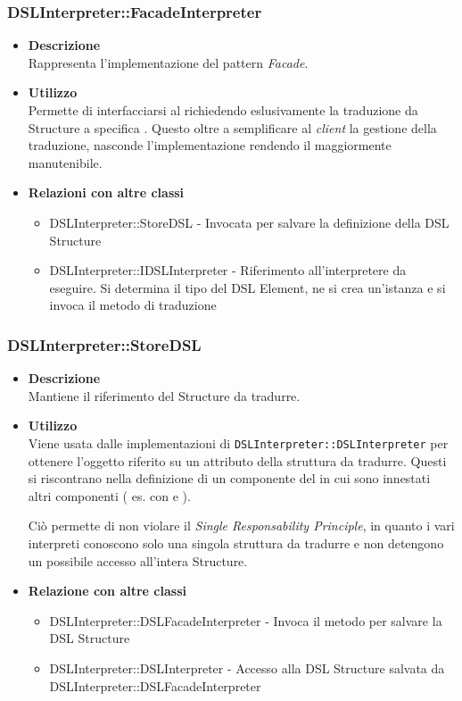 \subsubsection{DSLInterpreter::FacadeInterpreter}
\begin{itemize}
\item \textbf{Descrizione} \hfill \\
  Rappresenta l'implementazione del pattern \textit{Facade}.
\item \textbf{Utilizzo} \hfill \\
  Permette di interfacciarsi al  richiedendo eslusivamente la traduzione da  Structure a specifica . Questo oltre a semplificare al \textit{client} la gestione della traduzione, nasconde l'implementazione rendendo il  maggiormente manutenibile.
\item \textbf{Relazioni con altre classi} \hfill
  \begin{itemize}
  \item DSLInterpreter::StoreDSL - Invocata per salvare la definizione della DSL Structure
  \item DSLInterpreter::IDSLInterpreter - Riferimento all'interpretere da eseguire. Si determina il tipo del DSL Element, ne si crea un'istanza e si invoca il metodo di traduzione
  \end{itemize}
\end{itemize}
\subsubsection{DSLInterpreter::StoreDSL}
\begin{itemize}
\item \textbf{Descrizione} \hfill \\
  Mantiene il riferimento del  Structure da tradurre.
\item \textbf{Utilizzo} \hfill \\
  Viene usata dalle implementazioni di \texttt{DSLInterpreter::DSLInterpreter} per ottenere l'oggetto riferito su un attributo della struttura da tradurre. Questi  si riscontrano nella definizione di un componente del  in cui sono innestati altri componenti ( es.  con  e  ).

  Ciò permette di non violare il \textit{Single Responsability Principle}, in quanto i vari interpreti conoscono solo una singola struttura da tradurre e non detengono un possibile accesso all'intera  Structure.
\item \textbf{Relazione con altre classi} \hfill
  \begin{itemize}
  \item DSLInterpreter::DSLFacadeInterpreter - Invoca il metodo per salvare la DSL Structure
  \item DSLInterpreter::DSLInterpreter - Accesso alla DSL Structure salvata da DSLInterpreter::DSLFacadeInterpreter
  \end{itemize}
\end{itemize}
